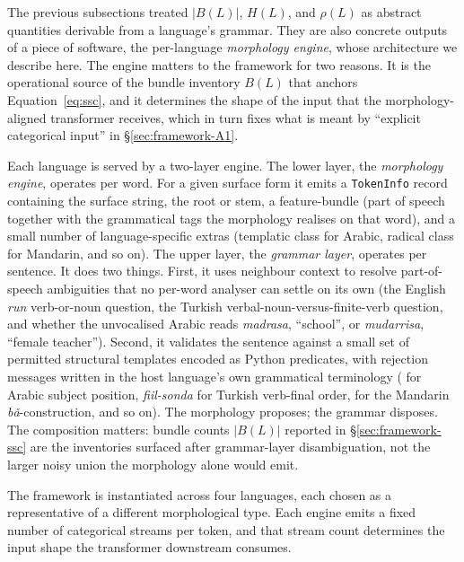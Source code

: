 The previous subsections treated $|B(L)|$, $H(L)$, and $\rho(L)$ as abstract quantities derivable from a language's grammar. They are also concrete outputs of a piece of software, the per-language \emph{morphology engine}, whose architecture we describe here. The engine matters to the framework for two reasons. It is the operational source of the bundle inventory $B(L)$ that anchors Equation~\ref{eq:ssc}, and it determines the shape of the input that the morphology-aligned transformer receives, which in turn fixes what is meant by ``explicit categorical input'' in \S\ref{sec:framework-A1}.

Each language is served by a two-layer engine. The lower layer, the \emph{morphology engine}, operates per word. For a given surface form it emits a \texttt{TokenInfo} record containing the surface string, the root or stem, a feature-bundle (part of speech together with the grammatical tags the morphology realises on that word), and a small number of language-specific extras (templatic class for Arabic, radical class for Mandarin, and so on). The upper layer, the \emph{grammar layer}, operates per sentence. It does two things. First, it uses neighbour context to resolve part-of-speech ambiguities that no per-word analyser can settle on its own (the English \emph{run} verb-or-noun question, the Turkish verbal-noun-versus-finite-verb question, and whether the unvocalised Arabic  reads \emph{madrasa}, ``school'', or \emph{mudarrisa}, ``female teacher''). Second, it validates the sentence against a small set of permitted structural templates encoded as Python predicates, with rejection messages written in the host language's own grammatical terminology ( for Arabic subject position, \emph{fiil-sonda} for Turkish verb-final order,  for the Mandarin \emph{b\v{a}}-construction, and so on). The morphology proposes; the grammar disposes. The composition matters: bundle counts $|B(L)|$ reported in \S\ref{sec:framework-ssc} are the inventories surfaced after grammar-layer disambiguation, not the larger noisy union the morphology alone would emit.

The framework is instantiated across four languages, each chosen as a representative of a different morphological type. Each engine emits a fixed number of categorical streams per token, and that stream count determines the input shape the transformer downstream consumes.

